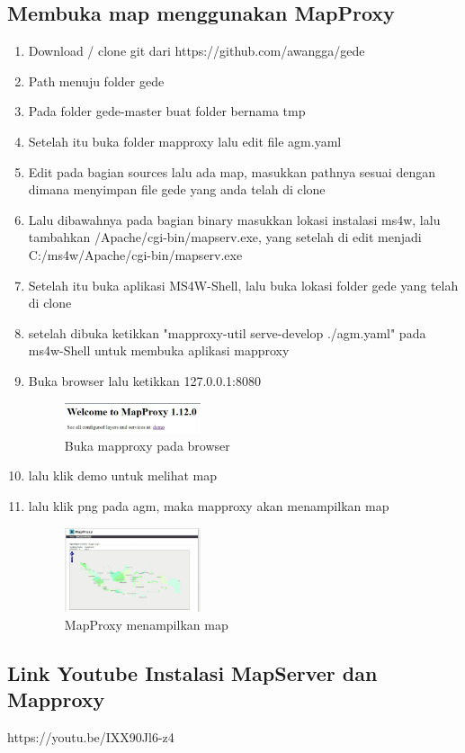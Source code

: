 \subsection{Membuka map menggunakan MapProxy}
\begin{enumerate}
	\item Download / clone git dari https://github.com/awangga/gede
	\item Path menuju folder gede 
	\item Pada folder gede-master buat folder bernama tmp
	\item Setelah itu buka folder mapproxy lalu edit file agm.yaml
	\item Edit pada bagian sources lalu ada map, masukkan pathnya sesuai dengan dimana menyimpan file gede yang anda telah di clone
	\item Lalu dibawahnya pada bagian binary masukkan lokasi instalasi ms4w, lalu tambahkan /Apache/cgi-bin/mapserv.exe, yang setelah di edit menjadi C:/ms4w/Apache/cgi-bin/mapserv.exe	
	\item Setelah itu buka aplikasi MS4W-Shell, lalu buka lokasi folder gede yang telah di clone
	\item setelah dibuka ketikkan "mapproxy-util serve-develop ./agm.yaml" pada ms4w-Shell untuk membuka aplikasi mapproxy
	\item Buka browser lalu ketikkan 127.0.0.1:8080
	\hfill\break
	\begin{figure}[H]
		\includegraphics[width=4cm]{figures/tugas4/1174086/buka.png}
		\centering
		\caption{Buka mapproxy pada browser}
	\end{figure}
	
	\item lalu klik demo untuk melihat map
	\item lalu klik png pada agm, maka mapproxy akan menampilkan map
	\hfill\break
	\begin{figure}[H]
		\includegraphics[width=4cm]{figures/tugas4/1174086/peta.png}
		\centering
		\caption{MapProxy menampilkan map}
	\end{figure}
	
\end{enumerate}

\subsection{Link Youtube Instalasi MapServer dan Mapproxy}
https://youtu.be/IXX90Jl6-z4
